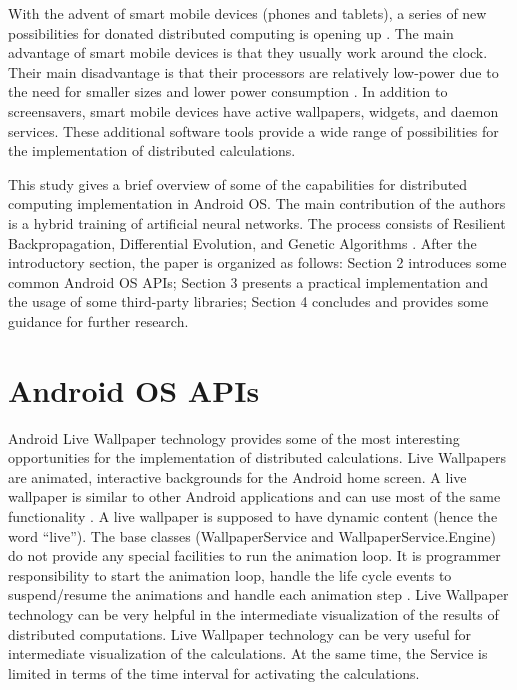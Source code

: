 \documentclass[a4paper,conference]{IEEEtran}
\begin{document}
With the advent of smart mobile devices (phones and tablets), a series of new possibilities for donated distributed computing is opening up \cite{Tapparello-01}. The main advantage of smart mobile devices is that they usually work around the clock. Their main disadvantage is that their processors are relatively low-power due to the need for smaller sizes and lower power consumption \cite{Chinara-01}. In addition to screensavers, smart mobile devices have active wallpapers, widgets, and daemon services. These additional software tools provide a wide range of possibilities for the implementation of distributed calculations. 

This study gives a brief overview of some of the capabilities for distributed computing implementation in Android OS. The main contribution of the authors is a hybrid training of artificial neural networks. The process consists of Resilient Backpropagation, Differential Evolution, and Genetic Algorithms \cite{Balabanov-01}. After the introductory section, the paper is organized as follows: Section 2 introduces some common Android OS APIs; Section 3 presents a practical implementation and the usage of some third-party libraries; Section 4 concludes and provides some guidance for further research. 

\section{Android OS APIs}

Android Live Wallpaper technology provides some of the most interesting opportunities for the implementation of distributed calculations. Live Wallpapers are animated, interactive backgrounds for the Android home screen. A live wallpaper is similar to other Android applications and can use most of the same functionality \cite{Vogel-01}. A live wallpaper is supposed to have dynamic content (hence the word “live”). The base classes (WallpaperService and WallpaperService.Engine) do not provide any special facilities to run the animation loop. It is programmer responsibility to start the animation loop, handle the life cycle events to suspend/resume the animations and handle each animation step \cite{Grouchnikov-01}. Live Wallpaper technology can be very helpful in the intermediate visualization of the results of distributed computations. Live Wallpaper technology can be very useful for intermediate visualization of the calculations. At the same time, the Service is limited in terms of the time interval for activating the calculations. 
\end{document}
